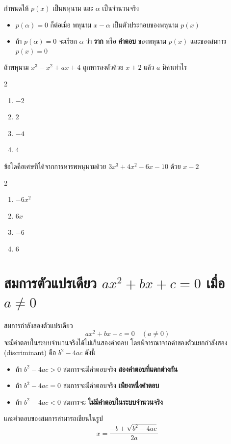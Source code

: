 \newpage
\begin{remarkbox}
กำหนดให้ $p(x)$ เป็นพหุนาม และ $\alpha$ เป็นจำนวนจริง
\begin{itemize}
    \item $p(\alpha)=0$ ก็ต่อเมื่อ พหุนาม $x-\alpha$ เป็นตัวประกอบของพหุนาม $p(x)$
    \item ถ้า $p(\alpha)=0$ จะเรียก $\alpha$ ว่า \textbf{ราก} หรือ \textbf{คำตอบ} ของพหุนาม $p(x)$  และของสมการ $p(x)=0$
\end{itemize}
\end{remarkbox}


\begin{examplebox}
ถ้าพหุนาม $x^3-x^2+a x+4$ ถูกหารลงตัวด้วย $x+2$ แล้ว $a$ มีค่าเท่าไร
\begin{multicols}{2}
\begin{enumerate}
\item $-2$
\item $2$
\item $-4$
\item $4$
\end{enumerate}
\end{multicols}
\end{examplebox}

\vspace{6cm}
\begin{examplebox}
ข้อใดคือเศษที่ได้จากการหารพหนุนามด้วย $3 x^3+4 x^2-6 x-10$ ด้วย $x-2$
\begin{multicols}{2}
\begin{enumerate}
\item $-6x^2$
\item $6 x$
\item $-6$
\item $6$
\end{enumerate}
\end{multicols}
\end{examplebox}

\newpage
\section{สมการตัวแปรเดียว $ax^2+bx+c=0$ เมื่อ $a\neq 0$}
\begin{theorembox}
สมการกำลังสองตัวแปรเดียว
\[
ax^2+bx+c=0 \quad (a\neq 0)
\]
จะมีคำตอบในระบบจำนวนจริงได้ไม่เกินสองคำตอบ  
โดยพิจารณาจากค่าของตัวแยกกำลังสอง (discriminant) คือ $b^2-4ac$ ดังนี้
\begin{itemize}
    \item ถ้า $b^2-4ac>0$ สมการจะมีคำตอบจริง \textbf{สองคำตอบที่แตกต่างกัน}
    \item ถ้า $b^2-4ac=0$ สมการจะมีคำตอบจริง \textbf{เพียงหนึ่งคำตอบ}
    \item ถ้า $b^2-4ac<0$ สมการจะ \textbf{ไม่มีคำตอบในระบบจำนวนจริง}
\end{itemize}
และคำตอบของสมการสามารถเขียนในรูป
\[
x=\dfrac{-b\pm\sqrt{b^2-4ac}}{2a}
\]
\end{theorembox}

